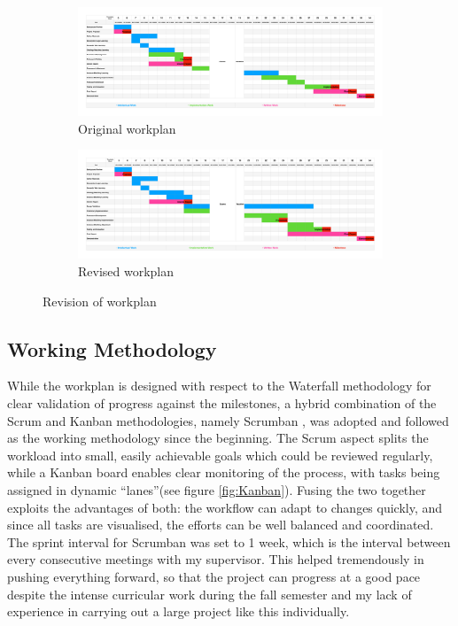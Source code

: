 \begin{figure}[ht]
\begin{subfigure}[ht]{\textwidth}
\includegraphics[width=\textwidth]{img/Gantt_old.pdf}
\caption{Original workplan}
\label{fig:Gantt_old}
\end{subfigure}
\begin{subfigure}[ht]{\textwidth}
\includegraphics[width=\textwidth]{img/Gantt_new.pdf}
\caption{Revised workplan}
\label{fig:Gantt_new}
\end{subfigure}
\caption{Revision of workplan}
\label{fig:Gantt}
\end{figure}

\subsection{Working Methodology}
While the workplan is designed with respect to the Waterfall methodology \cite{balaji2012waterfall} for clear validation of progress against the milestones, a hybrid combination of the Scrum and Kanban methodologies, namely Scrumban \cite{DBLP:conf/ispw/NikitinaKS12}, was adopted and followed as the working methodology since the beginning. The Scrum aspect splits the workload into small, easily achievable goals which could be reviewed regularly, while a Kanban board enables clear monitoring of the process, with tasks being assigned in dynamic \textquotedblleft lanes\textquotedblright \space (see figure \ref{fig:Kanban}). Fusing the two together exploits the advantages of both: the workflow can adapt to changes quickly, and since all tasks are visualised, the efforts can be well balanced and coordinated. The sprint interval for Scrumban was set to 1 week, which is the interval between every consecutive meetings with my supervisor. This helped tremendously in pushing everything forward, so that the project can progress at a good pace despite the intense curricular work during the fall semester and my lack of experience in carrying out a large project like this individually.

